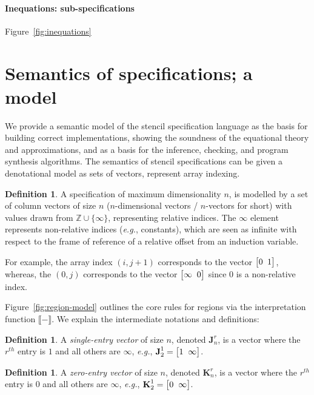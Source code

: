 \documentclass[9pt]{sigplanconf}
\newcounter{block}
\theoremstyle{definition}
\newtheorem{definition}[block]{Definition}
\newcommand{\eg}{\emph{e.g.}}
\newcommand{\interp}[1]{\llbracket{#1}\rrbracket}
\newcommand{\vtwoh}[2]{\setlength{\arraycolsep}{0em}
\left[\begin{array}{cc}#1 \; & \; #2\end{array}\right]}
\newcommand{\singleEntry}[2]{\textbf{J}_{#2}^{#1}}
\newcommand{\zeroEntry}[2]{\textbf{K}_{#2}^{#1}}
\begin{document}
\paragraph{Inequations: sub-specifications}

Figure~\ref{fig:inequations}

\section{Semantics of specifications; a model}
\label{sec:semantics}

\newcommand{\relix}{(\mathbb{Z}_\bot)^\mathbb{D}}

We provide a semantic model of the stencil specification language as
the basis for building correct implementations, showing the soundness
of the equational theory and approximations, and as a basis for the
inference, checking, and program synthesis algorithms.
The semantics of stencil specifications can be given a denotational
model as sets of vectors, represent array indexing.

\begin{definition}
  A specification of maximum dimensionality $n$, is modelled by a
  set of column vectors of size $n$  ($n$-dimensional vectors /
  $n$-vectors for short)
  with values drawn from $\mathbb{Z} \cup \{\infty\}$, representing
  relative indices. The $\infty$ element represents non-relative
  indices (\eg{}, constants), which are seen as infinite with respect
  to the frame of reference of a relative offset from an induction
  variable.

  For example, the array index $(i, j+1)$ corresponds to the vector
  $\vtwoh{0}{1}$, whereas, the $(0, j)$ corresponds to the
  vector $\vtwoh{\infty}{0}$ since $0$ is a non-relative index.
\end{definition}

Figure~\ref{fig:region-model} outlines the core rules for regions
via the interpretation function $\interp{-}$.  We explain the
intermediate notations and definitions:

\begin{definition}A \emph{single-entry vector} of size $n$, denoted
$\singleEntry{r}{n}$, is a vector
where the $r^{th}$ entry is $1$ and all others are $\infty$, \eg{},
$\singleEntry{1}{2} = \vtwoh{1}{\infty}$.
\end{definition}

\begin{definition}A \emph{zero-entry vector} of size $n$, denoted
$\zeroEntry{r}{n}$, is a vector where the $r^{th}$ entry is $0$ and all others
are $\infty$, \eg{}, $\zeroEntry{1}{2} = \vtwoh{0}{\infty}$.
\end{definition}
\end{document}

